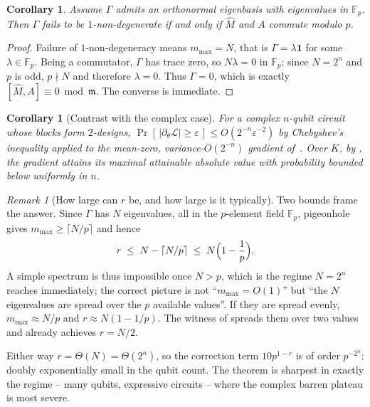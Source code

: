 \documentclass{ceurart}
\theoremstyle{plain}
\newtheorem{corollary}[theorem]{Corollary}
\theoremstyle{definition}
\theoremstyle{remark}
\newtheorem{remark}[theorem]{Remark}
\theoremstyle{plain}
\newcommand{\mm}{\mathfrak{m}}
\newcommand{\Id}{\mathbf{1}}
\newcommand{\loss}{\mathcal{L}}
\newcommand{\FF}{\mathbb{F}}
\begin{document}
\begin{corollary}
\label{cor:deg}
Assume $\Gamma$ admits an orthonormal eigenbasis with eigenvalues in $\FF_p$.
Then $\Gamma$ fails to be $1$-non-degenerate if and only if $\widehat M$ and
$A$ commute modulo $p$.
\end{corollary}

\begin{proof}
Failure of $1$-non-degeneracy means $m_{\max}=N$, that is $\Gamma=\lambda\Id$
for some $\lambda\in\FF_p$. Being a commutator, $\Gamma$ has trace zero, so
$N\lambda=0$ in $\FF_p$; since $N=2^{n}$ and $p$ is odd, $p\nmid N$ and
therefore $\lambda=0$. Thus $\Gamma=0$, which is exactly
$[\widehat M,A]\equiv0\bmod\mm$. The converse is immediate.
\end{proof}

\begin{corollary}[Contrast with the complex case]
\label{cor:contrast}
For a complex $n$-qubit circuit whose blocks form $2$-designs,
$\Pr[\,|\partial_\theta\loss|\ge\varepsilon\,]\le O(2^{-n}\varepsilon^{-2})$ by
Chebyshev's inequality applied to the mean-zero, variance-$O(2^{-n})$ gradient
of~\cite{Mc18}. Over $K$, by , the gradient attains its
\emph{maximal} attainable absolute value with probability bounded below
uniformly in $n$.
\end{corollary}

\begin{remark}[How large can $r$ be, and how large is it typically]
\label{rem:doubly}
Two bounds frame the answer. Since $\Gamma$ has $N$ eigenvalues, all in the
$p$-element field $\FF_p$, pigeonhole gives $m_{\max}\ge\lceil N/p\rceil$ and
hence
\[
  r\;\le\;N-\lceil N/p\rceil\;\le\;N\Bigl(1-\frac1p\Bigr).
\]
A simple spectrum is thus impossible once $N>p$, which is the regime
$N=2^{n}$ reaches immediately; the correct picture is not ``$m_{\max}=O(1)$''
but ``the $N$ eigenvalues are spread over the $p$ available values''. If they
are spread evenly, $m_{\max}\approx N/p$ and $r\approx N(1-1/p)$. The witness
of  spreads them over two values and already achieves
$r=N/2$.

Either way $r=\Theta(N)=\Theta(2^{n})$, so the correction term $10p^{1-r}$ is
of order $p^{-2^{n}}$: doubly exponentially small in the qubit count. The
theorem is sharpest in exactly the regime -- many qubits, expressive circuits
-- where the complex barren plateau is most severe.
\end{remark}

\end{document}
